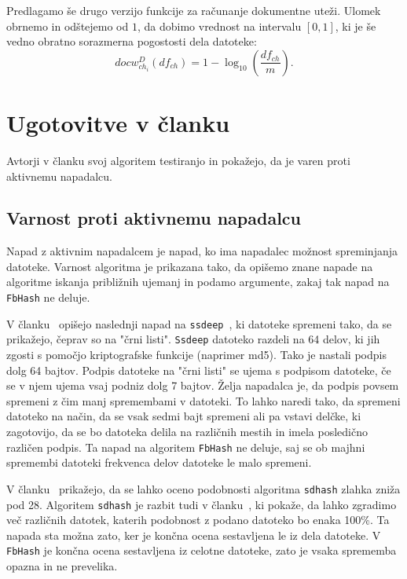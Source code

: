 \documentclass{acm_proc_article-sp}
\begin{document}
Predlagamo še drugo verzijo funkcije za računanje dokumentne uteži. Ulomek obrnemo in odštejemo od $1$, da dobimo vrednost na intervalu $[0, 1]$, ki je še vedno obratno sorazmerna pogostosti dela datoteke:
\[ docw_{ch_i}^{D}(df_{ch}) = 1 - \log_{10}\left(\frac{df_{ch}}{m}\right).\]

\section{Ugotovitve v \v{c}lanku}

Avtorji v članku svoj algoritem testiranjo in pokažejo, da je varen proti aktivnemu napadalcu.

\subsection{Varnost proti aktivnemu napadalcu}

Napad z aktivnim napadalcem je napad, ko ima napadalec možnost spreminjanja datoteke. Varnost algoritma je prikazana tako, da opišemo znane napade na algoritme iskanja približnih ujemanj in podamo argumente, zakaj tak napad na \texttt{FbHash} ne deluje.

V članku~\cite{5931110} opišejo naslednji napad na \texttt{ssdeep}~\cite{kornblum:ctph}, ki datoteke spremeni tako, da se prikažejo, čeprav so na "črni listi". \texttt{Ssdeep} datoteko razdeli na 64 delov, ki jih zgosti s pomočjo kriptografske funkcije (naprimer md5). Tako je nastali podpis dolg 64 bajtov. Podpis datoteke na "črni listi" se ujema s podpisom datoteke, če se v njem ujema vsaj podniz dolg 7 bajtov. Želja napadalca je, da podpis povsem spremeni z čim manj spremembami v datoteki. To lahko naredi tako, da spremeni datoteko na način, da se vsak sedmi bajt spremeni ali pa vstavi delčke, ki zagotovijo, da se bo datoteka delila na različnih mestih in imela posledično različen podpis. Ta napad na algoritem \texttt{FbHash} ne deluje, saj se ob majhni spremembi datoteki frekvenca delov datoteke le malo spremeni.

V članku~\cite{breitinger2012security} prikažejo, da se lahko oceno podobnosti algoritma \texttt{sdhash} zlahka zniža pod 28. Algoritem \texttt{sdhash} je razbit tudi v članku~\cite{chang2015collision}, ki pokaže, da lahko zgradimo več različnih datotek, katerih podobnost z podano datoteko bo enaka 100\%. Ta napada sta možna zato, ker je končna ocena sestavljena le iz dela datoteke. V \texttt{FbHash} je končna ocena sestavljena iz celotne datoteke, zato je vsaka sprememba opazna in ne prevelika. 
\end{document}
